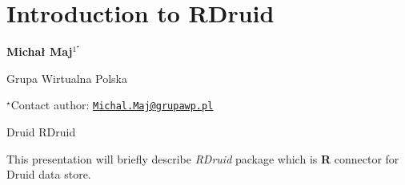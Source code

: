 \documentclass[\main/boa.tex]{subfiles}
\begin{document}
\section{Introduction to RDruid}

\begin{center}
  {\bf Michał Maj$^{1^\star}$}
\end{center}

\vskip 0.3cm

\begin{affiliations}
\begin{enumerate}
\begin{minipage}{0.915\textwidth}
\centering
\item Grupa Wirtualna Polska \\[-2pt]
\end{minipage}
\end{enumerate}
$^\star$Contact author: \href{mailto:Michal.Maj@grupawp.pl}{\nolinkurl{Michal.Maj@grupawp.pl}}\\
\end{affiliations}

\vskip 0.5cm

\begin{minipage}{0.915\textwidth}
\keywords Druid
\packages RDruid
\end{minipage}

\vskip 0.8cm

This presentation will briefly describe \emph{RDruid} package which is
\textbf{R} connector for Druid data store.
\end{document}

